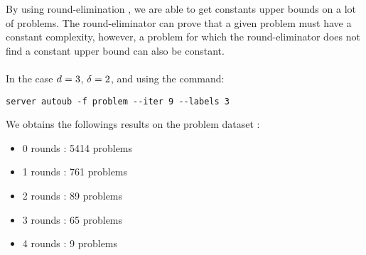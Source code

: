 By using round-elimination \cite{round-eliminator}, we are able to get constants upper bounds on a lot of problems. The round-eliminator can prove that a given problem must have a constant complexity, however, a problem for which the round-eliminator does not find a constant upper bound can also be constant.\\\\
In the case $d = 3$, $\delta = 2$, and using the command:
\begin{lstlisting}
server autoub -f problem --iter 9 --labels 3
\end{lstlisting}
We obtains the followings results on the problem dataset :
\begin{itemize}
    \item 0 rounds : 5414 problems
    \item 1 rounds : 761 problems
    \item 2 rounds : 89 problems
    \item 3 rounds : 65 problems
    \item 4 rounds : 9 problems
\end{itemize}